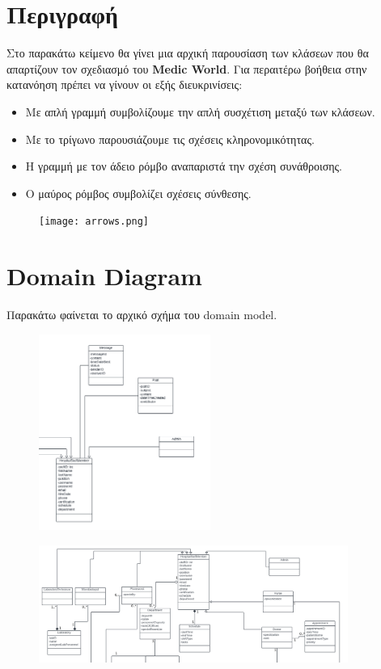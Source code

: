 \documentclass{article}
\begin{document}
\section{Περιγραφή}
Στο παρακάτω κείμενο θα γίνει μια αρχική παρουσίαση των κλάσεων που θα απαρτίζουν τον σχεδιασμό του \textbf{Medic World}. Για περαιτέρω βοήθεια στην κατανόηση πρέπει να γίνουν οι εξής διευκρινίσεις:
\begin{itemize}
    \item Με απλή γραμμή συμβολίζουμε την απλή συσχέτιση μεταξύ των κλάσεων.
    \item Με το τρίγωνο παρουσιάζουμε τις σχέσεις κληρονομικότητας.
    \item Η γραμμή με τον άδειο ρόμβο αναπαριστά την σχέση συνάθροισης.
    \item Ο μαύρος ρόμβος συμβολίζει σχέσεις σύνθεσης.
\end{itemize}

\begin{figure}[!htb]
        \centering
        \texttt{[image: arrows.png]}
\end{figure}
\newpage
\section{Domain Diagram}
Παρακάτω φαίνεται το αρχικό σχήμα του domain model.


\begin{figure}[!htb]
        \centering
        \includegraphics[width=0.5\textwidth]{domain3.png}
\end{figure}
        
\begin{figure}[!htb]
        \centering
        \includegraphics[width=0.9\textwidth]{domain1.png}
\end{figure}
        
\end{document}
